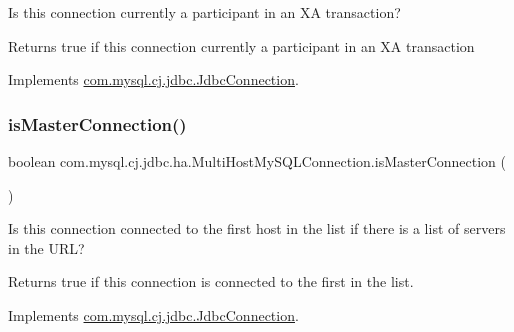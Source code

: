 Is this connection currently a participant in an XA transaction?

\begin{DoxyReturn}{Returns}
true if this connection currently a participant in an XA transaction 
\end{DoxyReturn}


Implements \mbox{\hyperlink{interfacecom_1_1mysql_1_1cj_1_1jdbc_1_1_jdbc_connection_a919152df37a4bf60c12c0818256a90a3}{com.\+mysql.\+cj.\+jdbc.\+Jdbc\+Connection}}.

\mbox{\label{classcom_1_1mysql_1_1cj_1_1jdbc_1_1ha_1_1_multi_host_my_s_q_l_connection_a0c1fb78db80d2aedf2d8aa89ff182b5a}} 
\subsubsection{\texorpdfstring{is\+Master\+Connection()}{isMasterConnection()}}
{\footnotesize\ttfamily boolean com.\+mysql.\+cj.\+jdbc.\+ha.\+Multi\+Host\+My\+S\+Q\+L\+Connection.\+is\+Master\+Connection (\begin{DoxyParamCaption}{ }\end{DoxyParamCaption})}

Is this connection connected to the first host in the list if there is a list of servers in the U\+RL?

\begin{DoxyReturn}{Returns}
true if this connection is connected to the first in the list. 
\end{DoxyReturn}


Implements \mbox{\hyperlink{interfacecom_1_1mysql_1_1cj_1_1jdbc_1_1_jdbc_connection_a012dc133872dd4d6db6d6f98118d3251}{com.\+mysql.\+cj.\+jdbc.\+Jdbc\+Connection}}.

\mbox{\label{classcom_1_1mysql_1_1cj_1_1jdbc_1_1ha_1_1_multi_host_my_s_q_l_connection_a47d81e605bf65122771ecb727b6177ed}} 
